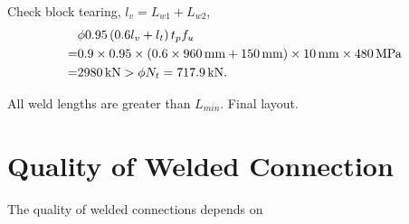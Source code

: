 \begin{solution}
\begin{enumerate}
Check block tearing, $l_v=L_{w1}+L_{w2}$,
\begin{align*}
&\phi0.95\left(0.6l_{v}+l_{t}\right)t_pf_u\\
=&0.9\times0.95\times\left(0.6\times\SI{960}{\milli\meter}+\SI{150}{\milli\meter}\right)\times\SI{10}{\milli\meter}\times\SI{480}{\mega\pascal}\\
=&\SI{2980}{\kilo\newton}>\phi{}N_t=\SI{717.9}{\kilo\newton}.
\end{align*}

All weld lengths are greater than $L_{min}$.
Final layout.
\begin{figure}[H]
\centering

\end{figure}
\end{enumerate}
\end{solution}
\section{Quality of Welded Connection}
The quality of welded connections depends on

